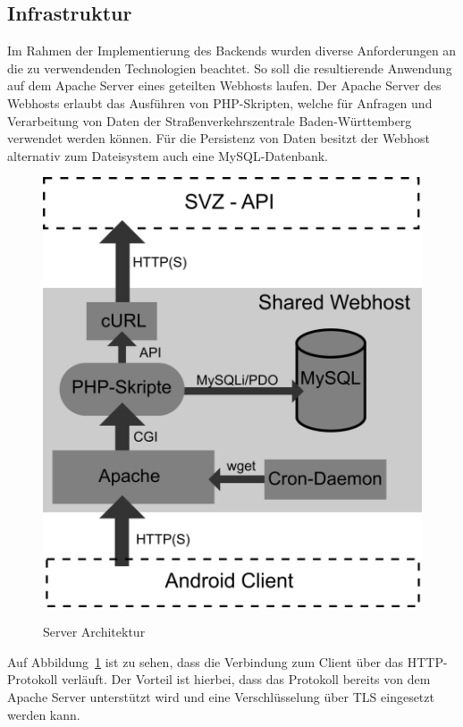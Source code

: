 \subsection{Infrastruktur}
Im Rahmen der Implementierung des Backends wurden diverse Anforderungen an die zu verwendenden Technologien beachtet. So soll die resultierende Anwendung auf dem Apache Server eines geteilten Webhosts laufen. Der Apache Server des Webhosts erlaubt das Ausführen von PHP-Skripten, welche für Anfragen und Verarbeitung von Daten der Straßenverkehrszentrale Baden-Württemberg verwendet werden können. Für die Persistenz von Daten besitzt der Webhost alternativ zum Dateisystem auch eine MySQL-Datenbank.
\begin{figure}[hp]
   \centering
     \includegraphics[width=13cm]{Bilder/server-arch} \\
 \caption{Server Architektur}
 \label{fig:serverarch}
\end{figure}

Auf Abbildung~\ref{fig:serverarch} ist zu sehen, dass die Verbindung zum Client über das HTTP-Protokoll verläuft. Der Vorteil ist hierbei, dass das Protokoll bereits von dem Apache Server unterstützt wird und eine Verschlüsselung über TLS eingesetzt werden kann.
